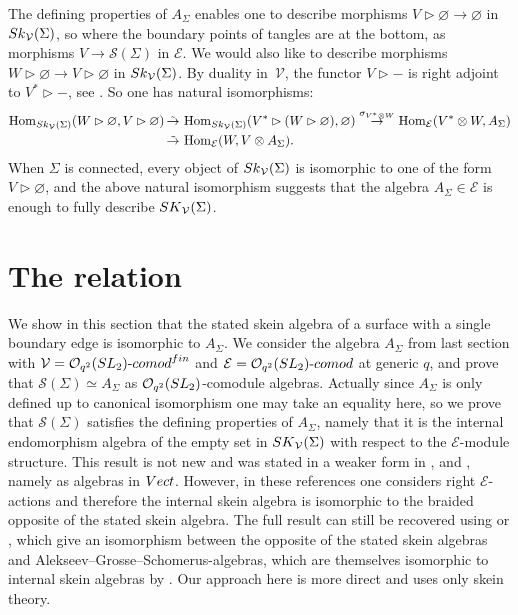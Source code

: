 \documentclass[11pt]{article}
\numberwithin{equation}{section}
\numberwithin{equation}{section}
\newcommand{\Hom}{\operatorname{Hom}}
\newcommand{\Oq}{\mathcal{O}_{q^2}({\rm SL}_2)}
\begin{document}
\begin{Remark}\label{rmkTopPtsAndASigma}
The defining properties of $A_\Sigma$ enables one to describe morphisms $V \rhd \varnothing \to \varnothing$ in ${\rm Sk}_\mathcal{V}(\Sigma)$, so where the boundary points of tangles are at the bottom, as morphisms $V \to \mathscr{S}(\Sigma)$ in $\mathcal{E}$. We would also like to describe morphisms $W\rhd \varnothing \to V \rhd \varnothing$ in ${\rm Sk}_\mathcal{V}(\Sigma)$. By duality in~$\mathcal{V}$, the functor $V\rhd-$ is right adjoint to $V^*\rhd-$, see \cite[Proposition~7.1.6]{EGNO}. So one has natural isomorphisms:
\begin{align*}
\Hom_{{\rm Sk}_\mathcal{V}(\Sigma)}(W\rhd\varnothing, V \rhd\varnothing) &\,\tilde{\to} \, \Hom_{{\rm Sk}_\mathcal{V}(\Sigma)}(V^*\rhd( W \rhd \varnothing), \varnothing) \overset{\sigma_{V^*\otimes W}}{\to} \Hom_{\mathcal{E}}(V^*\otimes W, A_\Sigma)
\\
&\, \tilde{\to} \, \Hom_{\mathcal{E}}(W,V\otimes A_\Sigma).
\end{align*}
When $\Sigma$ is connected, every object of ${\rm Sk}_\mathcal{V}(\Sigma)$ is isomorphic to one of the form $V\rhd\varnothing$, and the above natural isomorphism suggests that the algebra $A_\Sigma\in\mathcal{E}$ is enough to fully describe ${\rm SK}_\mathcal{V}(\Sigma)$.
\end{Remark}


\section{The relation}\label{SectRelation}
We show in this section that the stated skein algebra of a surface with a single boundary edge is isomorphic to $A_\Sigma$. We consider the algebra $A_\Sigma$ from last section with $\mathcal{V} = \Oq\text{-}{\rm comod}^{\rm fin}$ and $\mathcal{E} = \Oq\text{-}{\rm comod}$ at generic $q$, and prove that $\mathscr{S}(\Sigma)\simeq A_\Sigma$ as $\Oq$-comodule algebras. Actually since $A_\Sigma$ is only defined up to canonical isomorphism one may take an equality here, so we prove that $\mathscr{S}(\Sigma)$ satisfies the defining properties of $A_\Sigma$, namely that it is the internal endomorphism algebra of the empty set in ${\rm SK}_\mathcal{V}(\Sigma)$ with respect to the $\mathcal{E}$-module structure. This result is not new and was stated in a weaker form in \cite[Theorem~4.4]{LeYu}, \cite[Theorem~9.1]{LeSikora} and \cite[Remark 2.21]{Gunningham}, namely as algebras in $\rm Vect$. However, in these references one considers right $\mathcal{E}$-actions and therefore the internal skein algebra is isomorphic to the braided opposite of the stated skein algebra. The full result can still be recovered using \cite[Theorem~5.3]{Faitg} or \cite{Korinman}, which give an isomorphism between the opposite of the stated skein algebras and Alekseev--Grosse--Schomerus-algebras, which are themselves isomorphic to internal skein algebras by \cite{BBJ}. Our approach here is more direct and uses only skein theory.
\end{document}
